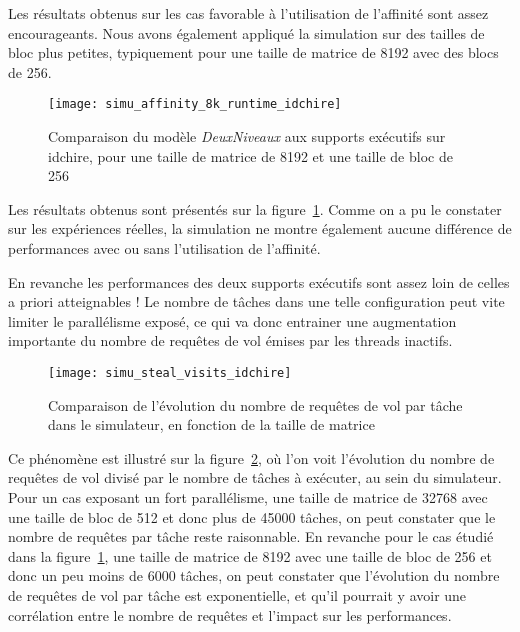 Les résultats obtenus sur les cas favorable à l'utilisation de l'affinité sont assez encourageants.
Nous avons également appliqué la simulation sur des tailles de bloc plus petites, typiquement pour une taille de matrice de 8192 avec des blocs de 256.

\begin{figure}[h!]
  \centering
  \texttt{[image: simu\_affinity\_8k\_runtime\_idchire]}
  \caption{Comparaison du modèle \emph{DeuxNiveaux} aux supports exécutifs sur idchire, pour une taille de matrice de 8192 et une taille de bloc de 256}\label{fig:simu:affinityavg-8k-vs-runtime:idchire}
\end{figure}



Les résultats obtenus sont présentés sur la figure~\ref{fig:simu:affinityavg-8k-vs-runtime:idchire}.
Comme on a pu le constater sur les expériences réelles, la simulation ne montre également aucune différence de performances avec ou sans l'utilisation de l'affinité.

En revanche les performances des deux supports exécutifs sont assez loin de celles a priori atteignables !
Le nombre de tâches dans une telle configuration peut vite limiter le parallélisme exposé, ce qui va donc entrainer une augmentation importante du nombre de requêtes de vol émises par les threads inactifs.

\begin{figure}[h!]
  \centering
  \texttt{[image: simu\_steal\_visits\_idchire]}
  \caption{Comparaison de l'évolution du nombre de requêtes de vol par tâche dans le simulateur, en fonction de la taille de matrice}\label{fig:simu:steals_per_task:idchire}
\end{figure}

Ce phénomène est illustré sur la figure~\ref{fig:simu:steals_per_task:idchire}, où l'on voit l'évolution du nombre de requêtes de vol divisé par le nombre de tâches à exécuter, au sein du simulateur.
Pour un cas exposant un fort parallélisme, une taille de matrice de 32768 avec une taille de bloc de 512 et donc plus de 45000 tâches, on peut constater que le nombre de requêtes par tâche reste raisonnable.
En revanche pour le cas étudié dans la figure~\ref{fig:simu:affinityavg-8k-vs-runtime:idchire}, une taille de matrice de 8192 avec une taille de bloc de 256 et donc un peu moins de 6000 tâches, on peut constater que l'évolution du nombre de requêtes de vol par tâche est exponentielle, et qu'il pourrait y avoir une corrélation entre le nombre de requêtes et l'impact sur les performances.

